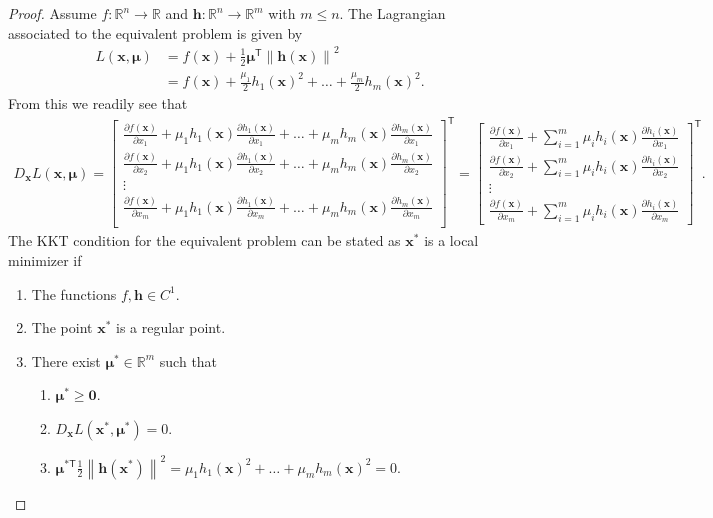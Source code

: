 \documentclass[12pt]{article}
\theoremstyle{definition}
\newcommand{\vc}[1]{\boldsymbol{#1}}
\newcommand{\norm}[1]{\left\lVert#1\right\rVert}
\newcommand{\tran}{\mathsf{T}}
\begin{document}
\begin{proof}
  Assume $f:\mathbb{R}^n\to\mathbb{R}$ and $\vc{h}:\mathbb{R}^n \to \mathbb{R}^m$ with $m \leq n$.
  The Lagrangian associated to the equivalent problem is given by
  \begin{align*}
    L(\vc{x}, \vc{\mu}) &= f(\vc{x}) + \frac{1}{2}\vc{\mu}^\tran\norm{\vc{h}(\vc{x})}^2 \\
    &= f(\vc{x})+ \frac{\mu_1}{2}h_1(\vc{x})^2 + \dots + \frac{\mu_m}{2}h_m(\vc{x})^2.
  \end{align*}
  From this we readily see that
  \begin{align*}
    D_{\vc{x}}L(\vc{x},\vc{\mu}) =
    \begin{bmatrix}
      \frac{\partial f(\vc{x})}{\partial x_1} + \mu_1 h_1(\vc{x}) \frac{\partial h_1(\vc{x})}{\partial x_1} + \dots + \mu_m h_m(\vc{x}) \frac{\partial h_m(\vc{x})}{\partial x_1}\\
      \frac{\partial f(\vc{x})}{\partial x_2} + \mu_1 h_1(\vc{x}) \frac{\partial h_1(\vc{x})}{\partial x_2} + \dots + \mu_m h_m(\vc{x}) \frac{\partial h_m(\vc{x})}{\partial x_2}\\
      \vdots \\
      \frac{\partial f(\vc{x})}{\partial x_m} + \mu_1 h_1(\vc{x}) \frac{\partial h_1(\vc{x})}{\partial x_m} + \dots + \mu_m h_m(\vc{x}) \frac{\partial h_m(\vc{x})}{\partial x_m}\\
    \end{bmatrix}^\tran
    =
    \begin{bmatrix}
      \frac{\partial f(\vc{x})}{\partial x_1} + \sum_{i=1}^m \mu_i h_i(\vc{x}) \frac{\partial h_i(\vc{x})}{\partial x_1}\\
      \frac{\partial f(\vc{x})}{\partial x_2} + \sum_{i=1}^m \mu_i h_i(\vc{x}) \frac{\partial h_i(\vc{x})}{\partial x_2}\\
      \vdots\\
      \frac{\partial f(\vc{x})}{\partial x_m} + \sum_{i=1}^m \mu_i h_i(\vc{x}) \frac{\partial h_i(\vc{x})}{\partial x_m}
    \end{bmatrix}^\tran.
  \end{align*}
  The KKT condition for the equivalent problem can be stated as $\vc{x}^*$ is a local minimizer if
  \begin{enumerate}[label=\roman*.]
    \item The functions $f, \vc{h} \in C^1$.
    \item The point $\vc{x}^*$ is a regular point.
    \item There exist $\vc{\mu}^{*} \in \mathbb{R}^m$ such that
      \begin{enumerate}
        \item $\vc{\mu}^* \geq \vc{0}$.
        \item $D_{\vc{x}}L(\vc{x}^*,\vc{\mu}^*) = 0$.
        \item $\vc{\mu}^{*\tran}\frac{1}{2}\norm{\vc{h}(\vc{x}^*)}^2 = \mu_1 h_1(\vc{x})^2 + \dots + \mu_m h_m(\vc{x})^2 =0.$
      \end{enumerate}
  \end{enumerate}


\end{proof}
\end{document}

